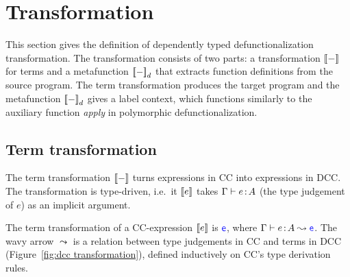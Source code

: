 


\section{Transformation}

This section gives the definition of dependently typed defunctionalization transformation.
The transformation consists of two parts: a transformation ${[\![ - ]\!]}$ for terms and a metafunction ${[\![ - ]\!]}_d$ that extracts function definitions from the source program. The term transformation produces the target program and the metafunction ${[\![ - ]\!]}_d$ gives a label context, which functions similarly to the auxiliary function \textit{apply} in polymorphic defunctionalization.

\subsection{Term transformation}

The term transformation ${[\![ - ]\!]}$ turns expressions in CC into expressions in DCC. The transformation is type-driven, i.e.~it ${[\![ e ]\!]}$ takes $\Gamma \vdash e \hspace{0.5mm}{:}\hspace{0.5mm} A$ (the type judgement of $e$) as an implicit argument.

\begin{definition}	
The term transformation of a CC-expression ${[\![ e ]\!]}$ is $\target{e}$, where $\Gamma \vdash e \goodcolon A \leadsto \target{e}$. The wavy arrow $\leadsto$ is a relation between type judgements in CC and terms in DCC  (Figure~\ref{fig:dcc transformation}), defined inductively on CC's type derivation rules.
\end{definition}

